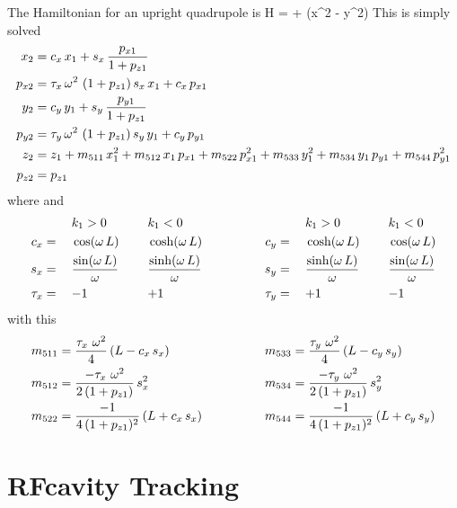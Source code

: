 The Hamiltonian for an upright quadrupole is
\Begineq
  H =  +  (x^2 - y^2)
\Endeq
This is simply solved
\begin{align}
  x_2    &= c_x \, x_1 + s_x \, \frac{p_{x1}}{1 + p_{z1}} \nonumber \\
  p_{x2} &= \tau_x \, \omega^2 \, \, (1 + p_{z1}) \, s_x \, x_1 + c_x \, p_{x1} \nonumber \\
  y_2    &= c_y \, y_1 + s_y \, \frac{p_{y1}}{1 + p_{z1}} \nonumber \\
  p_{y2} &= \tau_y \, \omega^2 \, \, (1 + p_{z1}) \, s_y \, y_1 + c_y \, p_{y1} \\
  z_2    &= z_1 + m_{511} \, x_1^2 + m_{512} \, x_1 \, p_{x1} + m_{522} \, p_{x1}^2 + 
                   m_{533} \, y_1^2 + m_{534} \, y_1 \, p_{y1} + m_{544} \, p_{y1}^2 \nonumber \\
  p_{z2} &= p_{z1} \nonumber
\end{align}
where 
\Begineq
  \om \equiv {}
\Endeq
and
\begin{alignat}{6}
         &\hspace*{3ex}  && k_1 > 0          &\hspace*{3ex}& k_1 < 0 & \qquad \qquad
         &\hspace*{3ex}  && k_1 > 0          &\hspace*{3ex}& k_1 < 0 \nonumber \\
     c_x &=   && \cos  (\omega \, L) && \cosh (\omega \, L) & \qquad \qquad
     c_y &=   && \cosh (\omega \, L) && \cos  (\omega \, L) \nonumber \\
     s_x &=   && \frac{\sin  (\omega \, L)}{\omega} && \frac{\sinh (\omega \, L)}{\omega} & \qquad \qquad
     s_y &=   && \frac{\sinh (\omega \, L)}{\omega} && \frac{\sin  (\omega \, L)}{\omega} \\
  \tau_x &=   && {-}1             && {+}1             & \qquad \qquad
  \tau_y &=   && {+}1             && {-}1             \nonumber
\end{alignat}
with this
\begin{alignat}{2}
  m_{511} &= \frac{\tau_x \,\, \omega^2}{4} \, (L - c_x \, s_x) & \qquad \qquad
  m_{533} &= \frac{\tau_y \,\, \omega^2}{4} \, (L - c_y \, s_y) \nonumber \\
  m_{512} &= \frac{-\tau_x \,\, \omega^2}{2 \, (1 + p_{z1})} \, s_x^2 & \qquad \qquad
  m_{534} &= \frac{-\tau_y \,\, \omega^2}{2 \, (1 + p_{z1})} \, s_y^2 \\
  m_{522} &= \frac{-1}{4 \, (1 + p_{z1})^2} \, (L + c_x \, s_x) & \qquad \qquad
  m_{544} &= \frac{-1}{4 \, (1 + p_{z1})^2} \, (L + c_y \, s_y) \nonumber
\end{alignat}

\section{RFcavity Tracking}
\label{s:rfcavity.std}

